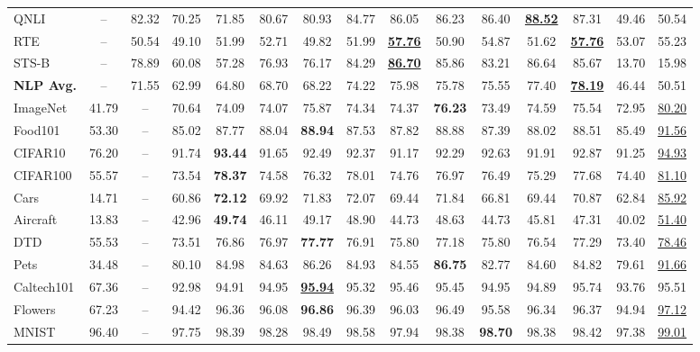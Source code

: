 \documentclass[10pt,twocolumn,letterpaper]{article}
\begin{document}
\begin{table*}[ht]
\begin{tabular}{lccccccccccccc|c}
QNLI & -- & 82.32 & 70.25 & 71.85 & 80.67 & 80.93 & 84.77 & 86.05 & 86.23 & 86.40 & \underline{\textbf{88.52}} & 87.31 & 49.46 & 50.54 \\
RTE & -- & 50.54 & 49.10 & 51.99 & 52.71 & 49.82 & 51.99 & \underline{\textbf{57.76}} & 50.90 & 54.87 & 51.62 & \underline{\textbf{57.76}} & 53.07 & 55.23 \\
STS-B & -- & 78.89 & 60.08 & 57.28 & 76.93 & 76.17 & 84.29 & \underline{\textbf{86.70}} & 85.86 & 83.21 & 86.64 & 85.67 & 13.70 & 15.98 \\
\midrule
\textbf{NLP Avg.} & -- & 71.55 & 62.99 & 64.80 & 68.70 & 68.22 & 74.22 & 75.98 & 75.78 & 75.55 & 77.40 & \underline{\textbf{78.19}} & 46.44 & 50.51 \\
\midrule
ImageNet & 41.79 & -- & 70.64 & 74.09 & 74.07 & 75.87 & 74.34 & 74.37 & \textbf{76.23} & 73.49 & 74.59 & 75.54 & 72.95 & \underline{80.20} \\
Food101 & 53.30 & -- & 85.02 & 87.77 & 88.04 & \textbf{88.94} & 87.53 & 87.82 & 88.88 & 87.39 & 88.02 & 88.51 & 85.49 & \underline{91.56} \\
CIFAR10 & 76.20 & -- & 91.74 & \textbf{93.44} & 91.65 & 92.49 & 92.37 & 91.17 & 92.29 & 92.63 & 91.91 & 92.87 & 91.25 & \underline{94.93} \\
CIFAR100 & 55.57 & -- & 73.54 & \textbf{78.37} & 74.58 & 76.32 & 78.01 & 74.76 & 76.97 & 76.49 & 75.29 & 77.68 & 74.40 & \underline{81.10} \\
Cars & 14.71 & -- & 60.86 & \textbf{72.12} & 69.92 & 71.83 & 72.07 & 69.44 & 71.84 & 66.81 & 69.44 & 70.87 & 62.84 & \underline{85.92} \\
Aircraft & 13.83 & -- & 42.96 & \textbf{49.74} & 46.11 & 49.17 & 48.90 & 44.73 & 48.63 & 44.73 & 45.81 & 47.31 & 40.02 & \underline{51.40} \\
DTD & 55.53 & -- & 73.51 & 76.86 & 76.97 & \textbf{77.77} & 76.91 & 75.80 & 77.18 & 75.80 & 76.54 & 77.29 & 73.40 & \underline{78.46} \\
Pets & 34.48 & -- & 80.10 & 84.98 & 84.63 & 86.26 & 84.93 & 84.55 & \textbf{86.75} & 82.77 & 84.60 & 84.82 & 79.61 & \underline{91.66} \\
Caltech101 & 67.36 & -- & 92.98 & 94.91 & 94.95 & \textbf{\underline{95.94}} & 95.32 & 95.46 & 95.45 & 94.95 & 94.89 & 95.74 & 93.76 & 95.51 \\
Flowers & 67.23 & -- & 94.42 & 96.36 & 96.08 & \textbf{96.86} & 96.39 & 96.03 & 96.49 & 95.58 & 96.34 & 96.37 & 94.94 & \underline{97.12} \\
MNIST & 96.40 & -- & 97.75 & 98.39 & 98.28 & 98.49 & 98.58 & 97.94 & 98.38 & \textbf{98.70} & 98.38 & 98.42 & 97.38 & \underline{99.01} \\

\end{tabular}
\end{table*}
\end{document}
